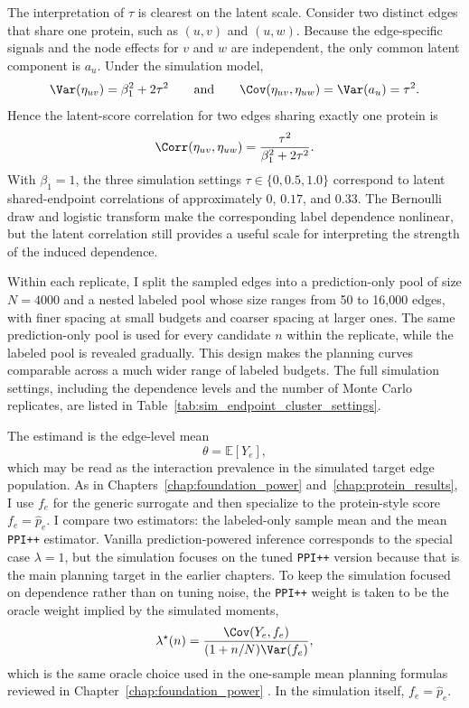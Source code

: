 The interpretation of $\tau$ is clearest on the latent scale. Consider two distinct edges that share one protein, such as $(u,v)$ and $(u,w)$. Because the edge-specific signals and the node effects for $v$ and $w$ are independent, the only common latent component is $a_u$. Under the simulation model,
\[
\Var(\eta_{uv}) = \beta_1^2 + 2\tau^2
\qquad\text{and}\qquad
\Cov(\eta_{uv}, \eta_{uw}) = \Var(a_u) = \tau^2.
\]
Hence the latent-score correlation for two edges sharing exactly one protein is
\[
\Corr(\eta_{uv}, \eta_{uw})
=
\frac{\tau^2}{\beta_1^2 + 2\tau^2}.
\]
With $\beta_1=1$, the three simulation settings $\tau \in \{0,0.5,1.0\}$ correspond to latent shared-endpoint correlations of approximately $0$, $0.17$, and $0.33$. The Bernoulli draw and logistic transform make the corresponding label dependence nonlinear, but the latent correlation still provides a useful scale for interpreting the strength of the induced dependence.



Within each replicate, I split the sampled edges into a prediction-only pool of size $N=4000$ and a nested labeled pool whose size ranges from 50 to 16,000 edges, with finer spacing at small budgets and coarser spacing at larger ones. The same prediction-only pool is used for every candidate $n$ within the replicate, while the labeled pool is revealed gradually. This design makes the planning curves comparable across a much wider range of labeled budgets. The full simulation settings, including the dependence levels and the number of Monte Carlo replicates, are listed in Table~\ref{tab:sim_endpoint_cluster_settings}.

The estimand is the edge-level mean
\[
\theta = \mathbb{E}[Y_e],
\]
which may be read as the interaction prevalence in the simulated target edge population. As in Chapters~\ref{chap:foundation_power} and~\ref{chap:protein_results}, I use \(f_e\) for the generic surrogate and then specialize to the protein-style score \(f_e=\hat p_e\). I compare two estimators: the labeled-only sample mean and the mean \texttt{PPI++} estimator. Vanilla prediction-powered inference corresponds to the special case \(\lambda=1\), but the simulation focuses on the tuned \texttt{PPI++} version because that is the main planning target in the earlier chapters. To keep the simulation focused on dependence rather than on tuning noise, the \texttt{PPI++} weight is taken to be the oracle weight implied by the simulated moments,
\[
\lambda^{\star}(n)
=
\frac{\Cov(Y_e, f_e)}{(1+n/N)\Var(f_e)},
\]
which is the same oracle choice used in the one-sample mean planning formulas reviewed in Chapter~\ref{chap:foundation_power} \parencite{ppi_pp, ppi_power}. In the simulation itself, \(f_e=\hat p_e\).

